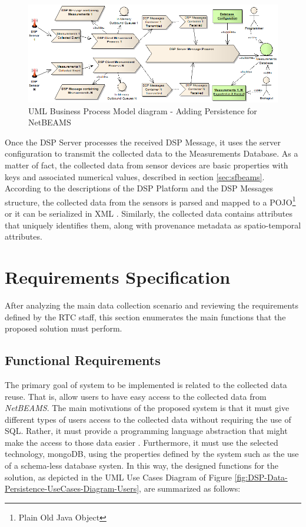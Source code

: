 \begin{figure}[!b]
  \centering
  \includegraphics[scale=0.5]{../diagrams/DSP-DataPersistence-Business-Diagram}
  \caption{UML Business Process Model diagram - Adding Persistence for NetBEAMS}
  \label{fig:dsp-persistence-business-process}
\end{figure}

Once the DSP Server processes the received DSP Message, it uses the server
configuration to transmit the collected data to the Measurements
Database. As a matter of fact, the collected data from sensor devices are basic
properties with keys and associated numerical values, described in section
\ref{sec:sfbeams}. According to the descriptions of the DSP Platform and the
DSP Messages structure, the collected data from the sensors is parsed and
mapped to a POJO\footnote{Plain Old Java Object} or it can be serialized in
XML \cite{xml}. Similarly, the collected data contains attributes that
uniquely identifies them, along with provenance metadata as spatio-temporal
attributes.

\section{Requirements Specification}

After analyzing the main data collection scenario and reviewing the
requirements defined by the RTC staff, this section enumerates the main
functions that the proposed solution must perform.

\subsection{Functional Requirements}
\label{sec:use-cases}

The primary goal of system to be implemented is related to the collected data
reuse. That is, allow users to have easy access to the collected data from
\emph{NetBEAMS}. The main motivations of the proposed system is that it must
give different types of users access to the collected data without requiring
the use of SQL. Rather, it must provide a programming language abstraction
that might make the access to those data easier \cite{sn-programming-language}.
Furthermore, it must use the selected technology, mongoDB, using the
properties defined by the system such as the use of a schema-less database
systen. In this way, the designed functions for the solution, as depicted in
the UML Use Cases Diagram of
Figure \ref{fig:DSP-Data-Persistence-UseCases-Diagram-Users}, are summarized as
follows:

